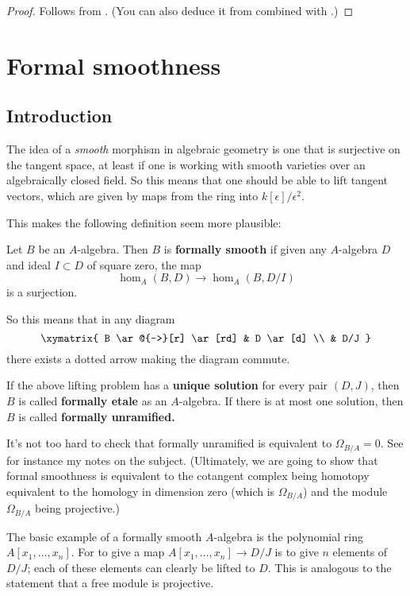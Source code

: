 \begin{proof}
Follows from
.
(You can also deduce it from
combined with
.)
\end{proof}


\section{Formal smoothness}

\subsection{Introduction}
The idea of a \emph{smooth} morphism in algebraic geometry is one that is
surjective on the tangent space, at least if one is working with smooth
varieties over an algebraically closed field. So this means that one should be
able to lift tangent vectors, which are given by maps from the ring into
$k[\epsilon]/\epsilon^2$.

This makes the following definition seem more plausible:

\begin{definition} 
Let $B$ be an $A$-algebra. Then $B$ is \textbf{formally smooth} if given any
$A$-algebra $D$ and ideal $I \subset D $ of square zero, the map
\[ \hom_A(B, D) \to \hom_A(B, D/I)\]
is a surjection.
\end{definition} 

So this means that in any diagram
\[ \xymatrix{
B \ar@{-->}[r] \ar[rd] & D \ar[d]  \\
& D/J
}\]
there exists a dotted arrow making the diagram commute.

\begin{definition} 
If the above lifting problem has a \textbf{unique solution} for every pair $(D,
J)$, then $B$ is called \textbf{formally etale} as an $A$-algebra. If there is
at most one solution, then $B$ is called \textbf{formally unramified.}
\end{definition} 


It's not too hard to check that formally unramified is equivalent to
$\Omega_{B/A} = 0$. See for instance my notes on the subject. (Ultimately, we
are going to show that formal smoothness is equivalent to the cotangent complex
being homotopy equivalent to the homology in dimension zero (which is
$\Omega_{B/A}$) and the module $\Omega_{B/A}$ being projective.)


The basic example of a formally smooth $A$-algebra is the polynomial ring
$A[x_1, \dots, x_n]$. For to give a map $A[x_1, \dots, x_n] \to D/J$ is to give
$n$ elements of $D/J$; each of these elements can clearly be lifted to $D$.
This is analogous to the statement that a free module is projective.

